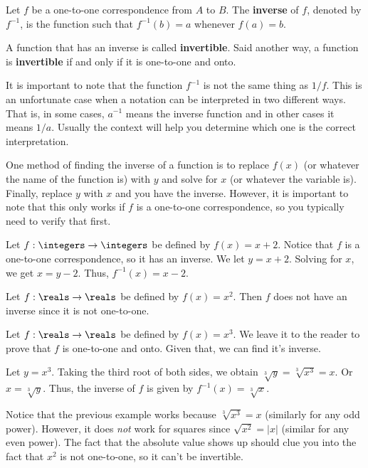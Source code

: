 \begin{df}
Let $f$ be a one-to-one correspondence from $A$ to $B$.
The {\bf inverse} of $f$, denoted by $f^{-1}$, is the function such that
$f^{-1}(b)=a$ whenever $f(a)=b$.

\noindent
A function that has an inverse is called {\bf invertible}.
Said another way, a function is {\bf invertible} if and only if it is one-to-one and onto.
\end{df}
\begin{rem}
It is important to note that the function $f^{-1}$ is not the same thing as $1/f$.
This is an unfortunate case when a notation can be interpreted in two different ways.
That is, in some cases, $a^{-1}$ means the inverse function and in other cases it means $1/a$.
Usually the context will help you determine which one is the correct interpretation.
\end{rem}

\begin{proc}
One method of finding the inverse of a function is to replace $f(x)$ (or whatever the name of the
function is) with $y$ and solve for $x$ (or whatever the variable is).
Finally, replace $y$ with $x$ and you have the inverse.
However, it is important to note that this only works if
$f$ is a one-to-one correspondence, so you typically need to verify
that first.
\end{proc}

\begin{exa}
Let $f:\integers\to\integers$ be defined by $f(x)=x+2$.
Notice that $f$ is a one-to-one correspondence, so it has an inverse.
We let $y=x+2$.  Solving for $x$, we get $x=y-2$.
Thus, $f^{-1}(x)=x-2$.
\end{exa}

\begin{exa}
Let $f:\reals\to\reals$ be defined by $f(x)=x^2$.  Then $f$ does not have an inverse since it is not one-to-one.
\end{exa}

\begin{exa}
Let $f:\reals\to\reals$ be defined by $f(x)=x^3$.
We leave it to the reader to prove that $f$ is one-to-one and onto.
Given that, we can find it's inverse.

Let $y=x^3$.  Taking the third root of both sides, we obtain
$\sqrt[3]{y}=\sqrt[3]{x^3}=x$.  Or $x=\sqrt[3]{y}$.
Thus, the inverse of $f$ is given by $f^{-1}(x)=\sqrt[3]{x}$.
\end{exa}
Notice that the previous
example works 
because $\sqrt[3]{x^3}=x$ (similarly for any odd power).
However,
it does {\em not} work for squares since $\sqrt{x^2}=|x|$
(similar for any even power). The fact that the absolute value
shows up should clue you into the fact that $x^2$ is not one-to-one,
so it can't be invertible.

